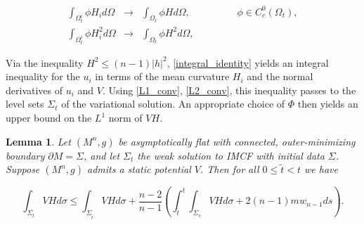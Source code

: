 \documentclass[12pt,twoside]{article}
\theoremstyle{plain}
\newtheorem{lemma}[theorem]{Lemma}
\theoremstyle{definition}
\theoremstyle{remark}
\renewcommand{\tilde}{\widetilde}
\numberwithin{equation}{section}
\begin{document}
\begin{eqnarray}
        \int_{\Omega^{i}_{t}} \phi H_{i} d\Omega &\rightarrow& \int_{\Omega_{t}} \phi H d\Omega, \hspace{2cm} \phi \in C^{0}_{c}(\Omega_{t}), \label{L1_conv} \\
     \int_{\Omega^{i}_{t}} \phi H_{i}^{2} d\Omega &\rightarrow& \int_{\Omega_{t}} \phi H^{2} d\Omega, \label{L2_conv}
\end{eqnarray}

Via the inequality $H^{2} \leq (n-1) |h|^{2}$, \eqref{integral_identity} yields an integral inequality for the $u_{i}$  in terms of the mean curvature $H_{i}$ and the normal derivatives of $u_{i}$ and $V$. Using \eqref{L1_conv}, \eqref{L2_conv}, this inequality passes to the level sets $\Sigma_{t}$ of the variational solution. An appropriate choice of $\Phi$ then yields an upper bound on the $L^{1}$ norm of $VH$.

\begin{lemma} 
Let $(M^{n},g)$ be asymptotically flat with connected, outer-minimizing boundary $\partial M=\Sigma$, and let $\Sigma_{t}$ the weak solution to IMCF with initial data $\Sigma$. Suppose $(M^{n},g)$ admits a static potential $V$. Then for all $0\leq \tilde{t} < t$ we have

\begin{equation} \label{key_inequality}
    \int_{\Sigma_{t}} VH d\sigma \leq \int_{\Sigma_{\tilde{t}}} VH d\sigma + \frac{n-2}{n-1} \left( \int_{\tilde{t}}^{t} \int_{\Sigma_{s}} VH d\sigma + 2(n-1)m w_{n-1} ds \right).
\end{equation}
\end{lemma}
\end{document}
